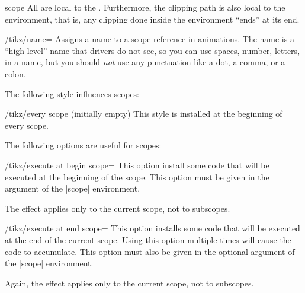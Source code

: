 \begin{environment}{{scope}}
    All  are local to the .
    Furthermore, the clipping path is also local to the environment, that is,
    any clipping done inside the environment ``ends'' at its end.
\begin{codeexample}[]
\end{codeexample}

    \begin{key}{/tikz/name=}
        Assigns a name to a scope reference in animations. The name is a
        ``high-level'' name that drivers do not see, so you can use spaces,
        number, letters, in a name, but you should \emph{not} use any
        punctuation like a dot, a comma, or a colon.
    \end{key}

    The following style influences scopes:
    \begin{stylekey}{/tikz/every scope (initially \normalfont empty)}
        This style is installed at the beginning of every scope.
    \end{stylekey}

    The following options are useful for scopes:
    \begin{key}{/tikz/execute at begin scope=}
        This option install some code that will be executed at the beginning of
        the scope. This option must be given in the argument of the |{scope}|
        environment.

        The effect applies only to the current scope, not to subscopes.
    \end{key}

    \begin{key}{/tikz/execute at end scope=}
        This option installs some code that will be executed at the end of the
        current scope. Using this option multiple times will cause the code to
        accumulate. This option must also be given in the optional argument of
        the |{scope}| environment.

        Again, the effect applies only to the current scope, not to subscopes.
    \end{key}
\end{environment}

